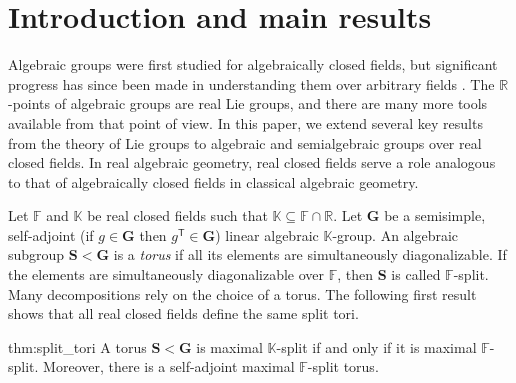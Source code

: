 \documentclass[12pt]{amsart}
\newcommand{\F}{\mathbb{F} }
\newcommand{\R}{\mathbb{R} }
\newcommand{\K}{\mathbb{K}}
\newcommand{\bG}{\mathbf{G}}
\newcommand{\bS}{\mathbf{S}}
\newcommand{\tran}{{^{\mathsf{T}}\!}}
\numberwithin{equation}{section}
\theoremstyle{remark} %
\begin{document}
\renewcommand{\baselinestretch}{0.6}\normalsize

	\setcounter{tocdepth}{2}
	\tableofcontents
	
	\renewcommand{\baselinestretch}{1.0}\normalsize
	
\section{Introduction and main results}
	
	Algebraic groups were first studied for algebraically closed fields, but significant progress has since been made in understanding them over arbitrary fields \cite{Bor66, Bor, Hum1, Zim}. The $\R$-points of algebraic groups are real Lie groups, and there are many more tools available from that point of view. In this paper, we extend several key results from the theory of Lie groups to algebraic and semialgebraic groups over real closed fields. In real algebraic geometry, real closed fields serve a role analogous to that of algebraically closed fields in classical algebraic geometry.
	
	Let $\F$ and $\K$ be real closed fields such that $\K \subseteq \F \cap \R$. Let $\bG$ be a semisimple, self-adjoint (if $g\in \bG$ then $g\tran \in \bG$) linear algebraic $\K$-group. An algebraic subgroup $\bS < \bG$ is a \emph{torus} if all its elements are simultaneously diagonalizable. If the elements are simultaneously diagonalizable over $\F$, then $\bS$ is called $\F$-split. Many decompositions rely on the choice of a torus. The following first result shows that all real closed fields define the same split tori.
	\begin{reptheorem}{thm:split_tori}
		A torus $\bS < \bG$ is maximal $\K$-split if and only if it is maximal $\F$-split. Moreover, there is a self-adjoint maximal $\F$-split torus.
	\end{reptheorem} 
	
\end{document}
